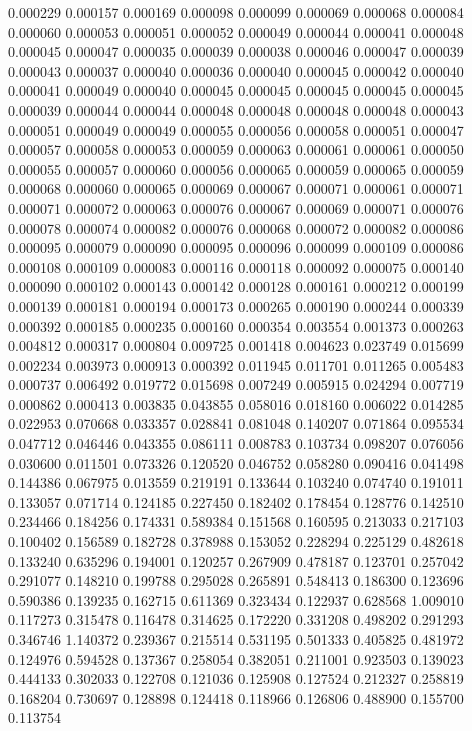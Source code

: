 0.000229
0.000157
0.000169
0.000098
0.000099
0.000069
0.000068
0.000084
0.000060
0.000053
0.000051
0.000052
0.000049
0.000044
0.000041
0.000048
0.000045
0.000047
0.000035
0.000039
0.000038
0.000046
0.000047
0.000039
0.000043
0.000037
0.000040
0.000036
0.000040
0.000045
0.000042
0.000040
0.000041
0.000049
0.000040
0.000045
0.000045
0.000045
0.000045
0.000045
0.000039
0.000044
0.000044
0.000048
0.000048
0.000048
0.000048
0.000043
0.000051
0.000049
0.000049
0.000055
0.000056
0.000058
0.000051
0.000047
0.000057
0.000058
0.000053
0.000059
0.000063
0.000061
0.000061
0.000050
0.000055
0.000057
0.000060
0.000056
0.000065
0.000059
0.000065
0.000059
0.000068
0.000060
0.000065
0.000069
0.000067
0.000071
0.000061
0.000071
0.000071
0.000072
0.000063
0.000076
0.000067
0.000069
0.000071
0.000076
0.000078
0.000074
0.000082
0.000076
0.000068
0.000072
0.000082
0.000086
0.000095
0.000079
0.000090
0.000095
0.000096
0.000099
0.000109
0.000086
0.000108
0.000109
0.000083
0.000116
0.000118
0.000092
0.000075
0.000140
0.000090
0.000102
0.000143
0.000142
0.000128
0.000161
0.000212
0.000199
0.000139
0.000181
0.000194
0.000173
0.000265
0.000190
0.000244
0.000339
0.000392
0.000185
0.000235
0.000160
0.000354
0.003554
0.001373
0.000263
0.004812
0.000317
0.000804
0.009725
0.001418
0.004623
0.023749
0.015699
0.002234
0.003973
0.000913
0.000392
0.011945
0.011701
0.011265
0.005483
0.000737
0.006492
0.019772
0.015698
0.007249
0.005915
0.024294
0.007719
0.000862
0.000413
0.003835
0.043855
0.058016
0.018160
0.006022
0.014285
0.022953
0.070668
0.033357
0.028841
0.081048
0.140207
0.071864
0.095534
0.047712
0.046446
0.043355
0.086111
0.008783
0.103734
0.098207
0.076056
0.030600
0.011501
0.073326
0.120520
0.046752
0.058280
0.090416
0.041498
0.144386
0.067975
0.013559
0.219191
0.133644
0.103240
0.074740
0.191011
0.133057
0.071714
0.124185
0.227450
0.182402
0.178454
0.128776
0.142510
0.234466
0.184256
0.174331
0.589384
0.151568
0.160595
0.213033
0.217103
0.100402
0.156589
0.182728
0.378988
0.153052
0.228294
0.225129
0.482618
0.133240
0.635296
0.194001
0.120257
0.267909
0.478187
0.123701
0.257042
0.291077
0.148210
0.199788
0.295028
0.265891
0.548413
0.186300
0.123696
0.590386
0.139235
0.162715
0.611369
0.323434
0.122937
0.628568
1.009010
0.117273
0.315478
0.116478
0.314625
0.172220
0.331208
0.498202
0.291293
0.346746
1.140372
0.239367
0.215514
0.531195
0.501333
0.405825
0.481972
0.124976
0.594528
0.137367
0.258054
0.382051
0.211001
0.923503
0.139023
0.444133
0.302033
0.122708
0.121036
0.125908
0.127524
0.212327
0.258819
0.168204
0.730697
0.128898
0.124418
0.118966
0.126806
0.488900
0.155700
0.113754
